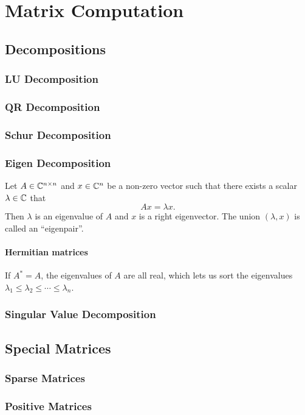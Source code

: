 \chapter{Matrix Computation}
\label{Ch: 8-Mat-Com}
\section{Decompositions}
\subsection{LU Decomposition}
\subsection{QR Decomposition}
\subsection{Schur Decomposition}
\subsection{Eigen Decomposition}
Let $A\in\mathbb C^{n\times n}$ and $x\in\mathbb C^n$ be a non-zero vector such that there exists a scalar $\lambda\in\mathbb C$ that 
\begin{equation*}
    A x = \lambda x. 
\end{equation*}
Then $\lambda$ is an eigenvalue of $A$ and $x$ is a right eigenvector. The union $(\lambda, x)$ is called an ``eigenpair''.
\subsubsection{Hermitian matrices}
If $A^{\ast} = A$, the eigenvalues of $A$ are all real, which lets us sort the eigenvalues $\lambda_1\le \lambda_2\le \cdots \le \lambda_n$.
\subsection{Singular Value Decomposition}
\section{Special Matrices}
\subsection{Sparse Matrices}
\subsection{Positive Matrices}
